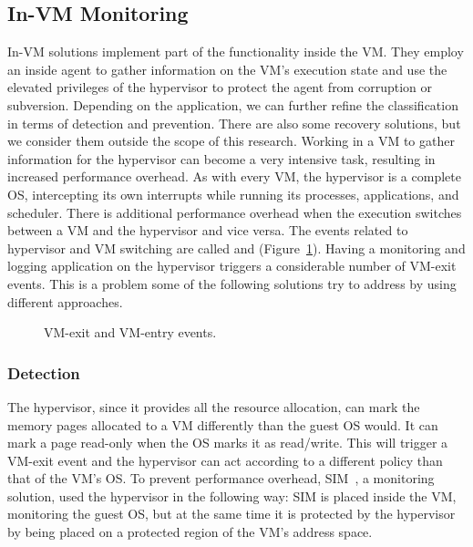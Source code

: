 \subsection{In-\ac{VM} Monitoring}\label{sub:invm}
In-\ac{VM} solutions implement part of the functionality inside the \ac{VM}. They employ an inside agent to gather information on the \ac{VM}'s execution state and use the elevated privileges of the hypervisor to protect the agent from corruption or subversion. Depending on the application, we can further refine the classification in terms of detection and prevention. There are also some recovery solutions, but we consider them outside the scope of this research. Working in a \ac{VM} to gather information for the hypervisor can become a very intensive task, resulting in increased performance overhead. As with every \ac{VM}, the hypervisor is a complete \ac{OS}, intercepting its own interrupts while running its processes, applications, and scheduler. There is additional performance overhead when the execution switches between a \ac{VM} and the hypervisor and vice versa. The events related to hypervisor and \ac{VM} switching are called  and  (Figure~\ref{fig:vmevents}). Having a monitoring and logging application on the hypervisor triggers a considerable number of VM-exit events. This is a problem some of the following solutions try to address by using different approaches.

\begin{figure}[ht]
	\centering
	
	\caption{VM-exit and VM-entry events.}
	\label{fig:vmevents}
\end{figure}

\subsubsection{Detection}

The hypervisor, since it provides all the resource allocation, can mark the memory pages allocated to a \ac{VM} differently than the guest \ac{OS} would. It can mark a page read-only when the \ac{OS} marks it as read/write. This will trigger a \ac{VM}-exit event and the hypervisor can act according to a different policy than that of the \ac{VM}’s \ac{OS}. To prevent performance overhead, SIM~\cite{sharif2009secure}, a monitoring solution,  used the hypervisor in the following way: SIM is placed inside the \ac{VM}, monitoring the guest \ac{OS}, but at the same time it is protected by the hypervisor by being placed on a protected region of the \ac{VM}’s address space. 

